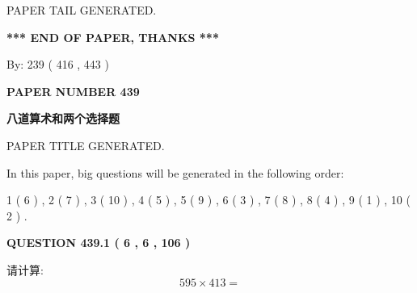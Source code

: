 \documentclass{ctexart}
\begin{document}
   
   
   
   
   
 \vspace{0.2in}
 
   
   
\vspace{2.0in} PAPER TAIL GENERATED.
   
   
   
   
\vspace{1.0in} 
{\textbf{\large{ *** END OF PAPER, THANKS *** }}} 
   
   
\hspace{1.0in} By: 
 239 ( 416 ,  443 )
   
   
   
   
\newpage 
\setcounter{page}{ 
   439001 } 
   
   
   
   
 {\textbf{ \Large{ PAPER NUMBER  439  }}}
   
   
\vspace{0.2in}
   
   
   
   
   
   
   
   
 \vspace{0.2in}
{\LARGE {\textbf{ 八道算术和两个选择题}}}
   
   
 PAPER TITLE GENERATED.
   
   
   
\vspace{0.2in}
   
In this paper, big questions will be generated in the following order: 
   
   
   1 ( 6 )
 ,
   2 ( 7 )
 ,
   3 ( 10 )
 ,
   4 ( 5 )
 ,
   5 ( 9 )
 ,
   6 ( 3 )
 ,
   7 ( 8 )
 ,
   8 ( 4 )
 ,
   9 ( 1 )
 ,
   10 ( 2 )
 .
  
\vspace{0.2in}
  
{\textbf{\Large{QUESTION
439.1 
 ( 6 , 6 , 106 )
}}}
  
  
 
请计算:
\begin{equation}
595  \times    %
413 = \nonumber
\end{equation}
 
 
 
\noindent{}
 
\end{document}
